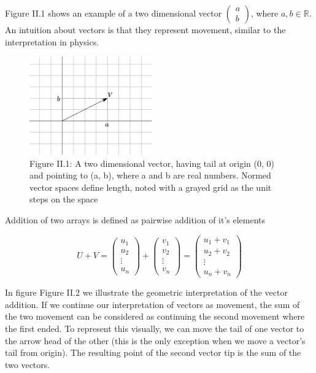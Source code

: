 Figure II.1 shows an example of a two dimensional vector \(\begin{pmatrix} a \\ b\end{pmatrix}\), where \(a, b \in \mathbb{R}\). An intuition about vectors is that they represent movement, similar to the interpretation in physics.


\begin{figure}[htbp]
    \begin{center}
        \includegraphics[width=150pt]{../img/ii-vector.png}
        \caption{Figure II.1: A two dimensional vector, having tail at origin (0, 0) and pointing to (a, b), where a and b are real numbers. Normed vector spaces define length, noted with a grayed grid as the unit steps on the space}
    \end{center}
\end{figure}


Addition of two arrays is defined as pairwise addition of it's elements

\[U+V = \begin{pmatrix} u_1 \\ u_2 \\ \vdots \\ u_n \end{pmatrix} + \begin{pmatrix} v_1 \\ v_2 \\ \vdots \\ v_n \end{pmatrix} = \begin{pmatrix} u_1 + v_1 \\ u_2 + v_2 \\ \vdots \\ u_n + v_n \end{pmatrix}\]

In figure Figure II.2 we illustrate the geometric interpretation of the vector addition. If we continue our interpretation of vectors as movement, the sum of the two movement can be considered as continuing the second movement where the first ended. To represent this visually, we can move the tail of one vector to the arrow head of the other (this is the only exception when we move a vector's tail from origin). The resulting point of the second vector tip is the sum of the two vectors.


